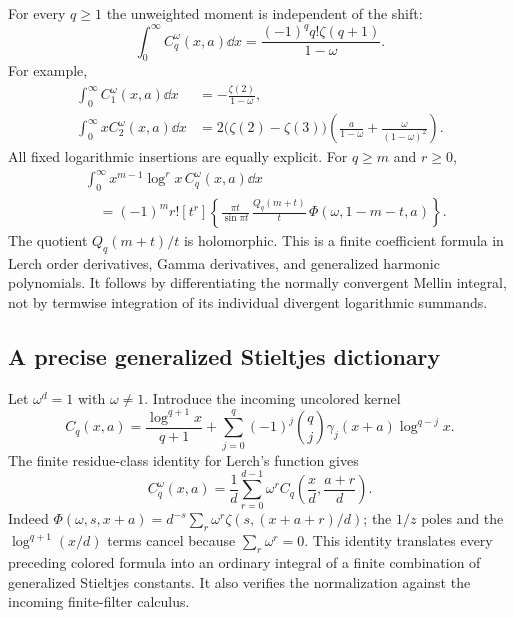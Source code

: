 For every $q\ge1$ the unweighted moment is independent of the shift:
\begin{equation}\label{col:unweighted}
 \boxed{\displaystyle
 \int_0^\infty C_q^\omega(x,a)\dd x
       =\frac{(-1)^q q!\zeta(q+1)}{1-\omega}.}
\end{equation}
For example,
\begin{align}
 \int_0^\infty C_1^\omega(x,a)\dd x
      &=-\frac{\zeta(2)}{1-\omega},\label{col:first}\\
 \int_0^\infty xC_2^\omega(x,a)\dd x
      &=2\bigl(\zeta(2)-\zeta(3)\bigr)
         \left(\frac{a}{1-\omega}
                    +\frac{\omega}{(1-\omega)^2}\right).
 \label{col:second}
\end{align}
All fixed logarithmic insertions are equally explicit. For $q\ge m$
and $r\ge0$,
\begin{equation}\label{col:log-moments}
\begin{split}
 &\int_0^\infty x^{m-1}\log^r x\,C_q^\omega(x,a)\dd x\\
 &\quad=(-1)^m r![t^r]\left\{
   \frac{\pi t}{\sin\pi t}\,
   \frac{Q_q(m+t)}t\,\Phi(\omega,1-m-t,a)\right\}.
\end{split}
\end{equation}
The quotient $Q_q(m+t)/t$ is holomorphic. This is a finite coefficient
formula in Lerch order derivatives, Gamma derivatives, and generalized
harmonic polynomials. It follows by differentiating the normally
convergent Mellin integral, not by termwise integration of its
individual divergent logarithmic summands.

\subsection{A precise generalized Stieltjes dictionary}

Let $\omega^d=1$ with $\omega\ne1$. Introduce the incoming uncolored
kernel \cite{repobalanced}
\begin{equation}\label{col:uncolored}
 C_q(x,a)=\frac{\log^{q+1}x}{q+1}
       +\sum_{j=0}^q(-1)^j\binom qj
                  \gamma_j(x+a)\log^{q-j}x.
\end{equation}
The finite residue-class identity for Lerch's function gives
\begin{equation}\label{col:stieltjes-dictionary}
 \boxed{\displaystyle
 C_q^\omega(x,a)=\frac1d\sum_{r=0}^{d-1}
       \omega^r C_q\!\left(\frac xd,\frac{a+r}{d}\right).}
\end{equation}
Indeed
$\Phi(\omega,s,x+a)=d^{-s}\sum_r\omega^r
\zeta(s,(x+a+r)/d)$; the $1/z$ poles and the
$\log^{q+1}(x/d)$ terms cancel because $\sum_r\omega^r=0$.
This identity translates every preceding colored formula into an
ordinary integral of a finite combination of generalized Stieltjes
constants. It also verifies the normalization against the incoming
finite-filter calculus.

